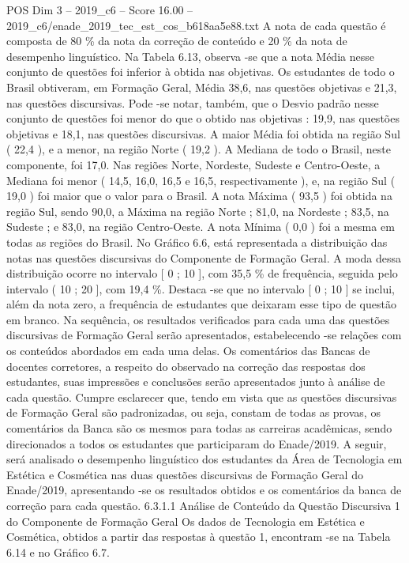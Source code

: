 \begin{textsample}{POS Dim 3 – 2019\_c6 – Score 16.00 – 2019\_c6/enade\_2019\_tec\_est\_cos\_b618aa5e88.txt}
A nota de cada questão é composta de 80 \% da nota da correção de conteúdo e 20 \% da nota de desempenho linguístico.
Na Tabela 6.13, observa -se que a nota Média nesse conjunto de questões foi inferior à obtida nas objetivas.
Os estudantes de todo o Brasil obtiveram, em Formação Geral, Média 38,6, nas questões objetivas e 21,3, nas questões discursivas.
Pode -se notar, também, que o Desvio padrão nesse conjunto de questões foi menor do que o obtido nas objetivas : 19,9, nas questões objetivas e 18,1, nas questões discursivas.
A maior Média foi obtida na região Sul ( 22,4 ), e a menor, na região Norte ( 19,2 ).
A Mediana de todo o Brasil, neste componente, foi 17,0.
Nas regiões Norte, Nordeste, Sudeste e Centro-Oeste, a Mediana foi menor ( 14,5, 16,0, 16,5 e 16,5, respectivamente ), e, na região Sul ( 19,0 ) foi maior que o valor para o Brasil.
A nota Máxima ( 93,5 ) foi obtida na região Sul, sendo 90,0, a Máxima na região Norte ; 81,0, na Nordeste ; 83,5, na Sudeste ; e 83,0, na região Centro-Oeste.
A nota Mínima ( 0,0 ) foi a mesma em todas as regiões do Brasil.
No Gráfico 6.6, está representada a distribuição das notas nas questões discursivas do Componente de Formação Geral.
A moda dessa distribuição ocorre no intervalo [ 0 ; 10 ], com 35,5 \% de frequência, seguida pelo intervalo ( 10 ; 20 ], com 19,4 \%.
Destaca -se que no intervalo [ 0 ; 10 ] se inclui, além da nota zero, a frequência de estudantes que deixaram esse tipo de questão em branco.
Na sequência, os resultados verificados para cada uma das questões discursivas de Formação Geral serão apresentados, estabelecendo -se relações com os conteúdos abordados em cada uma delas.
Os comentários das Bancas de docentes corretores, a respeito do observado na correção das respostas dos estudantes, suas impressões e conclusões serão apresentados junto à análise de cada questão.
Cumpre esclarecer que, tendo em vista que as questões discursivas de Formação Geral são padronizadas, ou seja, constam de todas as provas, os comentários da Banca são os mesmos para todas as carreiras acadêmicas, sendo direcionados a todos os estudantes que participaram do Enade/2019.
A seguir, será analisado o desempenho linguístico dos estudantes da Área de Tecnologia em Estética e Cosmética nas duas questões discursivas de Formação Geral do Enade/2019, apresentando -se os resultados obtidos e os comentários da banca de correção para cada questão. 6.3.1.1 Análise de Conteúdo da Questão Discursiva 1 do Componente de Formação Geral Os dados de Tecnologia em Estética e Cosmética, obtidos a partir das respostas à questão 1, encontram -se na Tabela 6.14 e no Gráfico 6.7.

\end{textsample}
